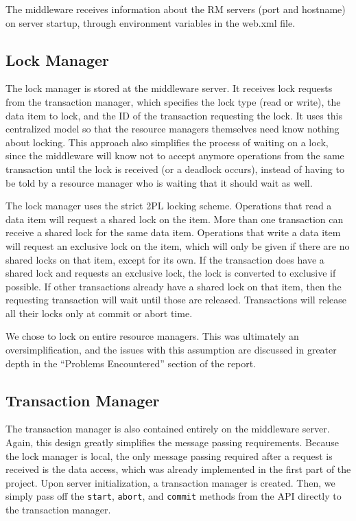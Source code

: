 \documentclass[11pt]{article}
\begin{document}
The middleware receives information about the RM servers (port and hostname) on server startup, through environment variables in the web.xml file.  \par

\subsection*{Lock Manager}

The lock manager is stored at the middleware server. It receives lock requests from the transaction manager, which specifies the lock type (read or write), the data item to lock, and the ID of the transaction requesting the lock. It uses this centralized model so that the resource managers themselves need know nothing about locking. This approach also simplifies the process of waiting on a lock, since the middleware will know not to accept anymore operations from the same transaction until the lock is received (or a deadlock occurs), instead of having to be told by a resource manager who is waiting that it should wait as well. \par

The lock manager uses the strict 2PL locking scheme. Operations that read a data item will request a shared lock on the item. More than one transaction can receive a shared lock for the same data item. Operations that write a data item will request an exclusive lock on the item, which will only be given if there are no shared locks on that item, except for its own. If the transaction does have a shared lock and requests an exclusive lock, the lock is converted to exclusive if possible. If other transactions already have a shared lock on that item, then the requesting transaction will wait until those are released. Transactions will release all their locks only at commit or abort time. \par

We chose to lock on entire resource managers. This was ultimately an oversimplification, and the issues with this assumption are discussed in greater depth in the ``Problems Encountered'' section of the report.\par

\subsection*{Transaction Manager}

The transaction manager is also contained entirely on the middleware server. Again, this design greatly simplifies the message passing requirements. Because the lock manager is local, the only message passing required after a request is received is the data access, which was already implemented in the first part of the project. Upon server initialization, a transaction manager is created. Then, we simply pass off the \texttt{start}, \texttt{abort}, and \texttt{commit} methods from the API directly to the transaction manager. \par
\end{document}
